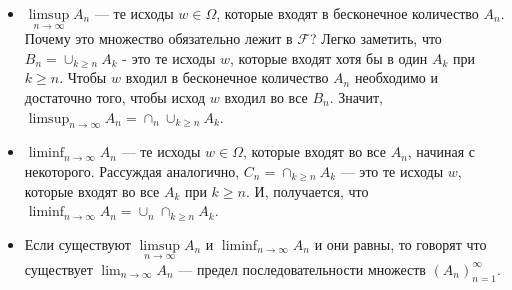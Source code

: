 \documentclass[pdftex, 12pt, a4paper]{article}
\def\F{\ensuremath{\mathcal{F}}} %
\renewcommand{\to}{\rightarrow}
\renewcommand{\geq}{\geqslant}
\theoremstyle{definition} %
\numberwithin{problem}{section}
\numberwithin{blits}{section}
\begin{document}
\begin{itemize}

\item $\limsup\limits_{n \to \infty} A_{n}$ --- те исходы $w\in\Omega$, которые входят в бесконечное количество $A_{n}$. Почему это множество обязательно лежит в $\F$? Легко заметить, что $\displaystyle B_{n}=\cup_{k\geq n} A_{k}$ - это те исходы $w$, которые входят хотя бы в один $A_{k}$ при $k\geq n$. Чтобы $w$ входил в бесконечное количество $A_{n}$ необходимо и достаточно того, чтобы исход $w$ входил во все $B_{n}$. Значит, $\displaystyle \limsup_{n \to \infty} A_{n}= \cap_{n}\cup_{k\geq n} A_{k}$. 

\item $\displaystyle \liminf_{n \to \infty} A_{n}$ --- те исходы $w\in\Omega$, которые входят во все $A_{n}$, начиная с некоторого. Рассуждая аналогично, $C_{n}=\cap_{k\geq n} A_{k}$ --- это те исходы $w$, которые входят во все $A_{k}$ при $k\geq n$. И, получается, что $\displaystyle \liminf_{n \to \infty} A_{n}=\cup_{n}\cap_{k\geq n}A_{k}$.

\item Если существуют $\limsup\limits_{n \to \infty} A_{n}$ и $\displaystyle \liminf_{n \to \infty} A_{n}$ и они равны, то говорят что существует $\displaystyle \lim_{n \to \infty} A_n$ --- предел последовательности множеств $(A_n)_{n=1}^\infty$. 
\end{itemize}
\end{document}

